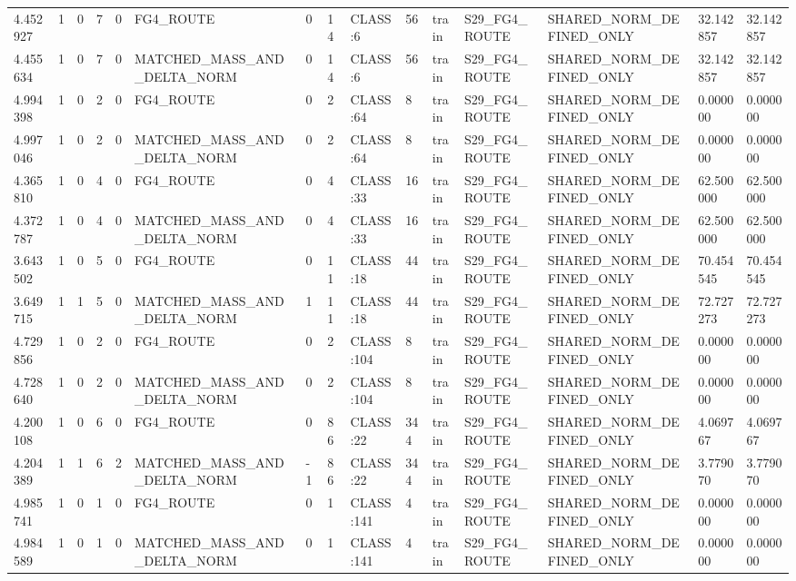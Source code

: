 \begin{tabular}{lllllllllllllll}
4.452927 & 1 & 0 & 7 & 0 & FG4\_ROUTE & 0 & 14 & CLASS:6 & 56 & train & S29\_FG4\_ROUTE & SHARED\_NORM\_DEFINED\_ONLY & 32.142857 & 32.142857 \\
4.455634 & 1 & 0 & 7 & 0 & MATCHED\_MASS\_AND\_DELTA\_NORM & 0 & 14 & CLASS:6 & 56 & train & S29\_FG4\_ROUTE & SHARED\_NORM\_DEFINED\_ONLY & 32.142857 & 32.142857 \\
4.994398 & 1 & 0 & 2 & 0 & FG4\_ROUTE & 0 & 2 & CLASS:64 & 8 & train & S29\_FG4\_ROUTE & SHARED\_NORM\_DEFINED\_ONLY & 0.000000 & 0.000000 \\
4.997046 & 1 & 0 & 2 & 0 & MATCHED\_MASS\_AND\_DELTA\_NORM & 0 & 2 & CLASS:64 & 8 & train & S29\_FG4\_ROUTE & SHARED\_NORM\_DEFINED\_ONLY & 0.000000 & 0.000000 \\
4.365810 & 1 & 0 & 4 & 0 & FG4\_ROUTE & 0 & 4 & CLASS:33 & 16 & train & S29\_FG4\_ROUTE & SHARED\_NORM\_DEFINED\_ONLY & 62.500000 & 62.500000 \\
4.372787 & 1 & 0 & 4 & 0 & MATCHED\_MASS\_AND\_DELTA\_NORM & 0 & 4 & CLASS:33 & 16 & train & S29\_FG4\_ROUTE & SHARED\_NORM\_DEFINED\_ONLY & 62.500000 & 62.500000 \\
3.643502 & 1 & 0 & 5 & 0 & FG4\_ROUTE & 0 & 11 & CLASS:18 & 44 & train & S29\_FG4\_ROUTE & SHARED\_NORM\_DEFINED\_ONLY & 70.454545 & 70.454545 \\
3.649715 & 1 & 1 & 5 & 0 & MATCHED\_MASS\_AND\_DELTA\_NORM & 1 & 11 & CLASS:18 & 44 & train & S29\_FG4\_ROUTE & SHARED\_NORM\_DEFINED\_ONLY & 72.727273 & 72.727273 \\
4.729856 & 1 & 0 & 2 & 0 & FG4\_ROUTE & 0 & 2 & CLASS:104 & 8 & train & S29\_FG4\_ROUTE & SHARED\_NORM\_DEFINED\_ONLY & 0.000000 & 0.000000 \\
4.728640 & 1 & 0 & 2 & 0 & MATCHED\_MASS\_AND\_DELTA\_NORM & 0 & 2 & CLASS:104 & 8 & train & S29\_FG4\_ROUTE & SHARED\_NORM\_DEFINED\_ONLY & 0.000000 & 0.000000 \\
4.200108 & 1 & 0 & 6 & 0 & FG4\_ROUTE & 0 & 86 & CLASS:22 & 344 & train & S29\_FG4\_ROUTE & SHARED\_NORM\_DEFINED\_ONLY & 4.069767 & 4.069767 \\
4.204389 & 1 & 1 & 6 & 2 & MATCHED\_MASS\_AND\_DELTA\_NORM & -1 & 86 & CLASS:22 & 344 & train & S29\_FG4\_ROUTE & SHARED\_NORM\_DEFINED\_ONLY & 3.779070 & 3.779070 \\
4.985741 & 1 & 0 & 1 & 0 & FG4\_ROUTE & 0 & 1 & CLASS:141 & 4 & train & S29\_FG4\_ROUTE & SHARED\_NORM\_DEFINED\_ONLY & 0.000000 & 0.000000 \\
4.984589 & 1 & 0 & 1 & 0 & MATCHED\_MASS\_AND\_DELTA\_NORM & 0 & 1 & CLASS:141 & 4 & train & S29\_FG4\_ROUTE & SHARED\_NORM\_DEFINED\_ONLY & 0.000000 & 0.000000 \\

\end{tabular}
